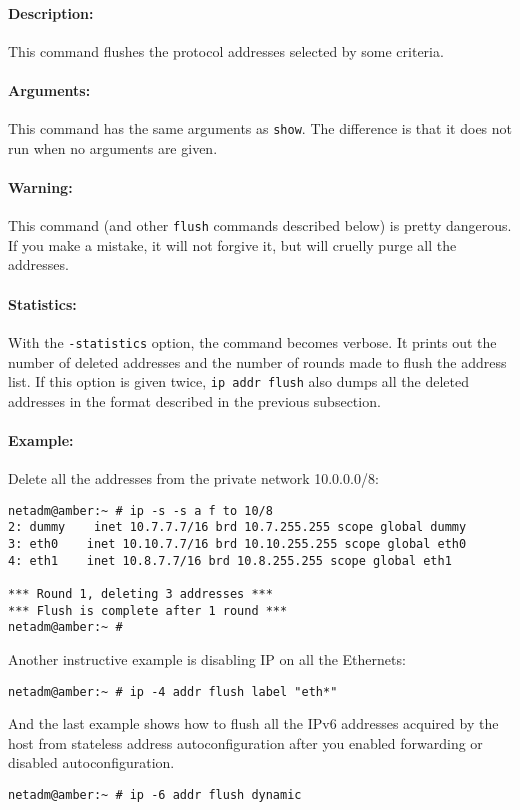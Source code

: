 \paragraph{Description:}This command flushes the protocol addresses
selected by some criteria.

\paragraph{Arguments:} This command has the same arguments as \verb|show|.
The difference is that it does not run when no arguments are given.

\paragraph{Warning:} This command (and other \verb|flush| commands
described below) is pretty dangerous. If you make a mistake, it will
not forgive it, but will cruelly purge all the addresses.

\paragraph{Statistics:} With the \verb|-statistics| option, the command
becomes verbose. It prints out the number of deleted addresses and the number
of rounds made to flush the address list. If this option is given
twice, \verb|ip addr flush| also dumps all the deleted addresses
in the format described in the previous subsection.

\paragraph{Example:} Delete all the addresses from the private network
10.0.0.0/8:
\begin{verbatim}
netadm@amber:~ # ip -s -s a f to 10/8
2: dummy    inet 10.7.7.7/16 brd 10.7.255.255 scope global dummy
3: eth0    inet 10.10.7.7/16 brd 10.10.255.255 scope global eth0
4: eth1    inet 10.8.7.7/16 brd 10.8.255.255 scope global eth1

*** Round 1, deleting 3 addresses ***
*** Flush is complete after 1 round ***
netadm@amber:~ # 
\end{verbatim}
Another instructive example is disabling IP on all the Ethernets:
\begin{verbatim}
netadm@amber:~ # ip -4 addr flush label "eth*"
\end{verbatim}
And the last example shows how to flush all the IPv6 addresses
acquired by the host from stateless address autoconfiguration
after you enabled forwarding or disabled autoconfiguration.
\begin{verbatim}
netadm@amber:~ # ip -6 addr flush dynamic
\end{verbatim}



